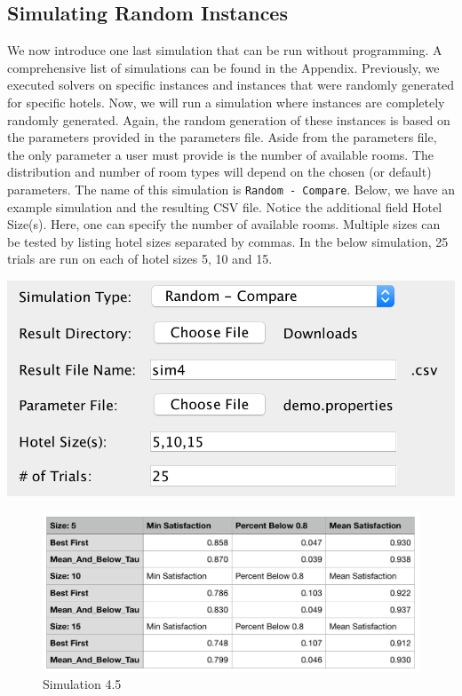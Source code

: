 \documentclass[11 pt]{article}
\begin{document}
\subsection{Simulating Random Instances}
\par We now introduce one last simulation that can be run without programming. A comprehensive list of simulations can be found in the Appendix. Previously, we executed solvers on specific instances and instances that were randomly generated for specific hotels. Now, we will run a simulation where instances are completely randomly generated. Again, the random generation of these instances is based on the parameters provided in the parameters file. Aside from the parameters file, the only parameter a user must provide is the number of available rooms. The distribution and number of room types will depend on the chosen (or default) parameters. The name of this simulation is \texttt{Random - Compare}. Below, we have an example simulation and the resulting CSV file. Notice the additional field Hotel Size(s). Here, one can specify the number of available rooms. Multiple sizes can be tested by listing hotel sizes separated by commas. In the below simulation, 25 trials are run on each of hotel sizes 5, 10 and 15.
\begin{center}
\includegraphics[scale=0.55]{images/sim4Screen.png}
\end{center}
\begin{figure}[H]
    \begin{center}
  \includegraphics[scale=0.6]{images/sim4CSV.png}
  \caption{Simulation 4.5}
  \end{center}
\end{figure}
\end{document}
